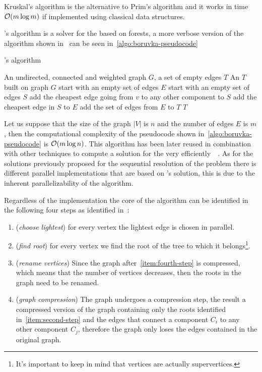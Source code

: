 \documentclass[a4paper,10pt]{article}
\begin{document}
Kruskal's algorithm is the alternative to Prim's algorithm and it works in time $\mathcal{O}(m\log{m})$ if implemented using classical data structures.

\brka's algorithm is a solver for the \mstp based on forests, a more verbose version of the algorithm shown in~\cite{boruvka-pseudocode} can be seen in~\ref{algo:boruvka-pseudocode}
\begin{algorithm}
	\caption{\brka's algorithm}
	\label{algo:boruvka-pseudocode}
	\begin{algorithmic}[1]
		\REQUIRE An undirected, connected and weighted graph $G$, a set of empty edges $T$
		\ENSURE An \mst$T$ built on graph $G$
			\STATE start with an empty set of edges $E$
				\STATE start with an empty set of edges $S$
					\STATE add the cheapest edge going from $v$ to any other component to $S$
				\ENDFOR
				\STATE add the cheapest edge in $S$ to $E$
			\ENDFOR
			\STATE add the set of edges from $E$ to $T$ 
		\ENDWHILE
		\STATE\RETURN $T$
	\end{algorithmic}
\end{algorithm}

Let us suppose that the size of the graph $|V|$ is $n$ and the number of edges $E$ is $m$, then the computational complexity of the pseudocode shown in~\ref{algo:boruvka-pseudocode} is $\mathcal{O}(m\log{n})$. This algorithm has been later reused in combination with other techniques to compute a solution for the \mstp very efficiently~\cite{boruvka-ackermann}~\cite{karger-klein-tarjan}. As for the solutions previously proposed for the sequential resolution of the problem there is different parallel implementations that are based on \brka's solution, this is due to the inherent parallelizability of the algorithm.

Regardless of the implementation the core of the algorithm can be identified in the following four steps as identified in~\cite{boruvka-steps}:
\begin{enumerate}
	\item\label{item:first-step} (\textit{choose lightest}) for every vertex the lightest edge is chosen in parallel.
	\item\label{item:second-step} (\textit{find root}) for every vertex we find the root of the tree to which it belongs\footnote{It's important to keep in mind that vertices are actually supervertices.}.
	\item\label{item:third-step} (\textit{rename vertices}) Since the graph after~\ref{item:fourth-step} is compressed, which means that the number of vertices decreases, then the roots in the graph need to be renamed. 
	\item\label{item:fourth-step} (\textit{graph compression}) The graph undergoes a compression step, the result a compressed version of the graph containing only the roots identified in~\ref{item:second-step} and the edges that connect a component $C_i$ to any other component $C_j$, therefore the graph only loses the edges contained in the original graph.
\end{enumerate}
\end{document}
